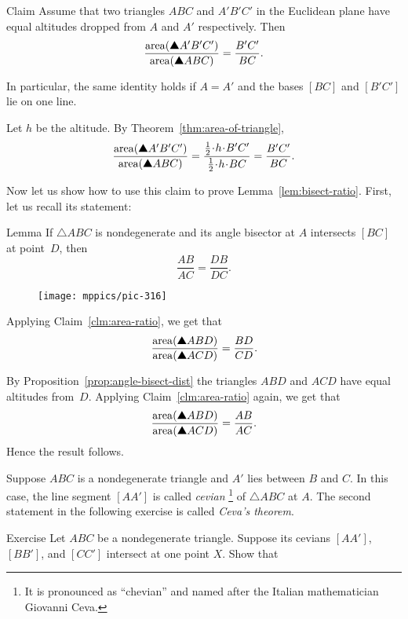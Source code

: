 {\begin{thm}{Claim}\label{clm:area-ratio}
Assume  that two triangles $ABC$ and $A'B'C'$ in the Euclidean plane 
have equal altitudes dropped from $A$ and $A'$ respectively.
Then
\[\frac{\area(\solidtriangle A'B'C')}{\area(\solidtriangle ABC)}
=
\frac{B'C'}{BC}.\]

In particular, the same identity holds if $A=A'$ and the bases $[BC]$ and $[B'C']$ lie on one line.
\end{thm}

Let $h$ be the altitude.
By Theorem~\ref{thm:area-of-triangle},
\[\frac{\area(\solidtriangle A'B'C')}{\area(\solidtriangle ABC)}
=
\frac{\frac12 \cdot h\cdot B'C'}{\frac12 \cdot h\cdot BC}
=
\frac{B'C'}{BC}.\]
\qedsf

Now let us show how to use this claim to prove Lemma~\ref{lem:bisect-ratio}.
First, let us recall its statement:

\begin{thm*}{Lemma}
If $\triangle A B C$ is nondegenerate and its angle bisector at $A$ intersects $[BC]$ at point~$D$, then 
$$\frac{AB}{AC}=\frac{DB}{DC}.$$
\end{thm*}

\begin{wrapfigure}{r}{30 mm}
\vskip-0mm
\centering
\texttt{[image: mppics/pic-316]}
\end{wrapfigure}

Applying  Claim~\ref{clm:area-ratio}, we get that
\[\frac{\area(\solidtriangle ABD)}{\area(\solidtriangle ACD)}
=\frac{BD}{CD}.\]

By Proposition~\ref{prop:angle-bisect-dist} the triangles $ABD$ and $ACD$ have equal altitudes from~$D$.
Applying  Claim~\ref{clm:area-ratio} again, we get that
\[\frac{\area(\solidtriangle ABD)}{\area(\solidtriangle ACD)}=\frac{AB}{AC}.\]
Hence the result follows.
\qeds

Suppose $ABC$ is a nondegenerate triangle and $A'$ lies between $B$ and $C$.
In this case, the line segment $[AA']$ is called \emph{cevian}%
\footnote{It is pronounced as ``chevian'' and named after the Italian mathematician Giovanni Ceva.} of $\triangle ABC$ at $A$.
The second statement in the following exercise is called \emph{Ceva's theorem}.



\begin{thm}{Exercise}\label{ex:ceva}
Let $ABC$ be a nondegenerate triangle.
Suppose its cevians $[AA']$, $[BB']$, and $[CC']$ intersect at one point $X$.
Show that 


\end{thm}}

